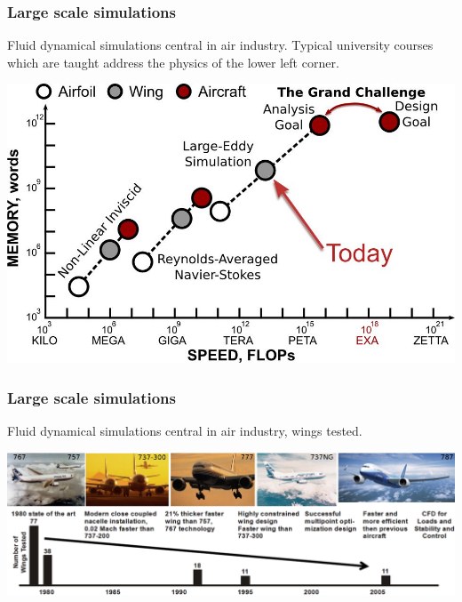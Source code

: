 \documentclass{beamer}
\begin{document}
\begin{frame}
\frametitle{Large scale simulations}

\begin{block}{Fluid dynamical simulations central in air industry.  Typical university courses which are taught address the physics of the lower left corner.  }


\centerline{\includegraphics[width=0.6\linewidth]{figures/fig10.jpg}}


\end{block}
\end{frame}

\begin{frame}
\frametitle{Large scale simulations}

\begin{block}{}
Fluid dynamical simulations central in air industry, wings tested.


\centerline{\includegraphics[width=1.0\linewidth]{figures/fig8.jpg}}


\end{block}
\end{frame}
\end{document}

